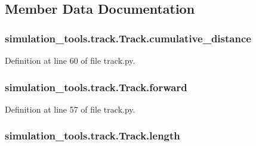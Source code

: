 \subsection{Member Data Documentation}
\subsubsection[{\texorpdfstring{cumulative\+\_\+distance}{cumulative_distance}}]{\setlength{\rightskip}{0pt plus 5cm}simulation\+\_\+tools.\+track.\+Track.\+cumulative\+\_\+distance}\hypertarget{classsimulation__tools_1_1track_1_1_track_a4513ffc3cdb1963bce98c678b093c40b}{}\label{classsimulation__tools_1_1track_1_1_track_a4513ffc3cdb1963bce98c678b093c40b}


Definition at line 60 of file track.\+py.

\subsubsection[{\texorpdfstring{forward}{forward}}]{\setlength{\rightskip}{0pt plus 5cm}simulation\+\_\+tools.\+track.\+Track.\+forward}\hypertarget{classsimulation__tools_1_1track_1_1_track_ae944fe956579cafe73bf09d3a7c072bc}{}\label{classsimulation__tools_1_1track_1_1_track_ae944fe956579cafe73bf09d3a7c072bc}


Definition at line 57 of file track.\+py.

\subsubsection[{\texorpdfstring{length}{length}}]{\setlength{\rightskip}{0pt plus 5cm}simulation\+\_\+tools.\+track.\+Track.\+length}\hypertarget{classsimulation__tools_1_1track_1_1_track_a24b60622edd3b0825f31fd6426d9380b}{}\label{classsimulation__tools_1_1track_1_1_track_a24b60622edd3b0825f31fd6426d9380b}


